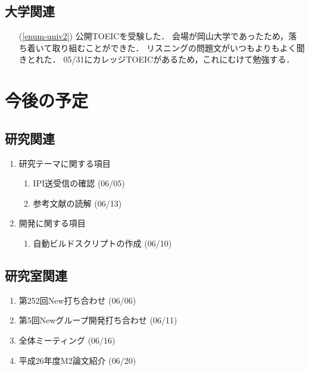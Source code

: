 \documentclass[fleqn, 14pt]{extarticle}
\begin{document}
\subsection{大学関連}
\label{sec-3-3}
\begin{itemize}
\item[(\ref{enum-univ2})]
公開TOEICを受験した．
会場が岡山大学であったため，落ち着いて取り組むことができた．
リスニングの問題文がいつもよりもよく聞きとれた．
05/31にカレッジTOEICがあるため，これにむけて勉強する．
\end{itemize}








\section{今後の予定}
\label{sec-4}
\subsection{研究関連}
\label{sec-4-1}

\begin{enumerate}
\item 研究テーマに関する項目
\hfill
\begin{enumerate}

\item IPI送受信の確認
\hfill
(06/05)
\item 参考文献の読解
\hfill
(06/13)

\end{enumerate}
\item 開発に関する項目
\hfill
\begin{enumerate}

\item 自動ビルドスクリプトの作成
\hfill
(06/10)

\end{enumerate}
\end{enumerate}

\subsection{研究室関連}
\label{sec-4-2}

\begin{enumerate}
\item 第252回New打ち合わせ
\hfill
\label{enum-3}
(06/06)
\item 第5回Newグループ開発打ち合わせ
\hfill
\label{enum-4}
(06/11)
\item 全体ミーティング
\hfill
\label{enum-5}
(06/16)
\item 平成26年度M2論文紹介
\hfill
\label{enum-6}
(06/20)
\end{enumerate}
\end{document}
